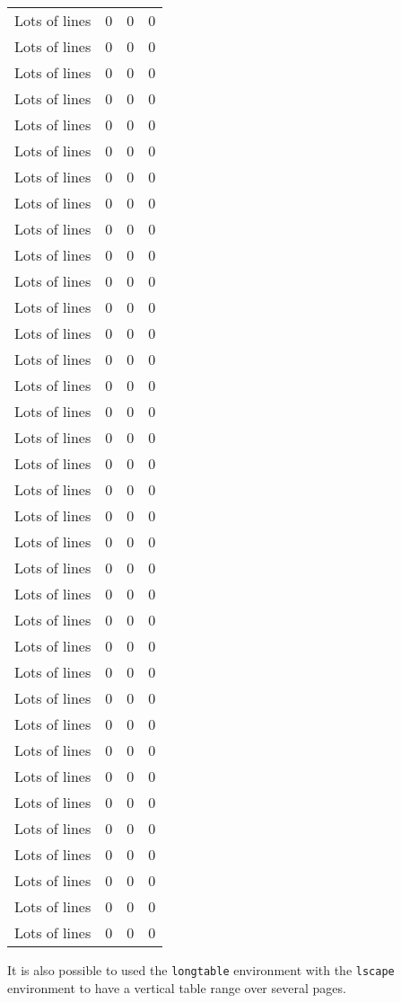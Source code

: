 \begin{longtable}{@{\extracolsep{\fill}}cccc}
Lots of lines & 0 & 0 & 0 \\
Lots of lines & 0 & 0 & 0 \\
Lots of lines & 0 & 0 & 0 \\
Lots of lines & 0 & 0 & 0 \\
Lots of lines & 0 & 0 & 0 \\
Lots of lines & 0 & 0 & 0 \\
Lots of lines & 0 & 0 & 0 \\
Lots of lines & 0 & 0 & 0 \\
Lots of lines & 0 & 0 & 0 \\
Lots of lines & 0 & 0 & 0 \\
Lots of lines & 0 & 0 & 0 \\
Lots of lines & 0 & 0 & 0 \\
Lots of lines & 0 & 0 & 0 \\
Lots of lines & 0 & 0 & 0 \\
Lots of lines & 0 & 0 & 0 \\
Lots of lines & 0 & 0 & 0 \\
Lots of lines & 0 & 0 & 0 \\
Lots of lines & 0 & 0 & 0 \\
Lots of lines & 0 & 0 & 0 \\
Lots of lines & 0 & 0 & 0 \\
Lots of lines & 0 & 0 & 0 \\
Lots of lines & 0 & 0 & 0 \\
Lots of lines & 0 & 0 & 0 \\
Lots of lines & 0 & 0 & 0 \\
Lots of lines & 0 & 0 & 0 \\
Lots of lines & 0 & 0 & 0 \\
Lots of lines & 0 & 0 & 0 \\
Lots of lines & 0 & 0 & 0 \\
Lots of lines & 0 & 0 & 0 \\
Lots of lines & 0 & 0 & 0 \\
Lots of lines & 0 & 0 & 0 \\
Lots of lines & 0 & 0 & 0 \\
Lots of lines & 0 & 0 & 0 \\
Lots of lines & 0 & 0 & 0 \\
Lots of lines & 0 & 0 & 0 \\
Lots of lines & 0 & 0 & 0 \\
%
\end{longtable}

It is also possible to used the \verb+longtable+ environment with the
\verb+lscape+ environment to have a vertical table range over several pages.
